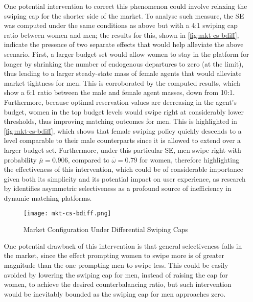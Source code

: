 One potential intervention to correct this phenomenon could involve relaxing the swiping cap for the shorter side of the market.
To analyse such measure, the SE was computed under the same conditions as above but with a 4:1 swiping cap ratio between women and men; the results for this, shown in \autoref{fig:mkt-cs-bdiff}, indicate the presence of two separate effects that would help alleviate the above scenario. 
First, a larger budget set would allow women to stay in the platform for longer by shrinking the number of endogenous departures to zero (at the limit), thus leading to a larger steady-state mass of female agents that would alleviate market tightness for men. 
This is corroborated by the computed results, which show a 6:1 ratio between the male and female agent masses, down from 10:1. 
Furthermore, because optimal reservation values are decreasing in the agent's budget, women in the top budget levels would swipe right at considerably lower thresholds, thus improving matching outcomes for men. 
This is highlighted in \autoref{fig:mkt-cs-bdiff}, which shows that female swiping policy quickly descends to a level comparable to their male counterparts since it is allowed to extend over a larger budget set. 
Furthermore, under this particular SE, men swipe right with probability $\overline\mu=0.906$, compared to $\overline\omega=0.79$ for women, therefore highlighting the effectiveness of this intervention, which could be of considerable importance given both its simplicity and its potential impact on user experience, as research by \cite{kanoria2021facilitating} identifies asymmetric selectiveness as a profound source of inefficiency in dynamic matching platforms. 
\begin{figure}[ht]
    \centering
    \caption{Market Configuration Under Differential Swiping Caps}
    \texttt{[image: mkt-cs-bdiff.png]}
    \label{fig:mkt-cs-bdiff} 
\end{figure}
One potential drawback of this intervention is that general selectiveness falls in the market, since the effect prompting women to swipe more is of greater magnitude than the one prompting men to swipe less. 
This could be easily avoided by lowering the swiping cap for men, instead of raising the cap for women, to achieve the desired counterbalancing ratio, but such intervention would be inevitably bounded as the swiping cap for men approaches zero.
